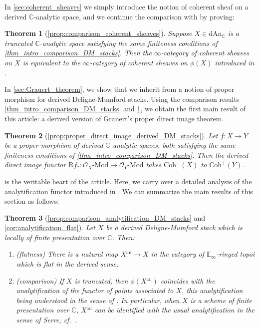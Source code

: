 \documentclass[12pt,a4paper,reqno]{amsart}
\theoremstyle{plain}
\newtheorem{thm-intro}{Theorem}
\theoremstyle{definition}
\theoremstyle{remark}
\numberwithin{equation}{section}
\begin{document}
In \cref{sec:coherent_sheaves} we simply introduce the notion of coherent sheaf on a derived {$\mathbb C$-analytic\xspace} space, and we continue the comparison with \cite{Porta_Yu_Higher_analytic_stacks_2014} by proving:

\begin{thm-intro}[{\cref{prop:comparison_coherent_sheaves}}] \label{thm_intro_comparison_coherent_sheaves}
	Suppose $X \in {\mathrm{dAn}_{\mathbb C}}$ is a truncated {$\mathbb C$-analytic\xspace} space satisfying the same finiteness conditions of \cref{thm_intro_comparison_DM_stacks}.
	Then the $\infty$-category of coherent sheaves on $X$ is equivalent to the $\infty$-category of coherent sheaves on $\phi(X)$ introduced in \cite{Porta_Yu_Higher_analytic_stacks_2014}.
\end{thm-intro}

In \cref{sec:Grauert_theorem}, we show that we inherit from \cite{Porta_Yu_Higher_analytic_stacks_2014} a notion of proper morphism for derived {Deligne-Mumford\xspace} stacks. Using the comparison results \cref{thm_intro_comparison_DM_stacks} and \cref{thm_intro_comparison_coherent_sheaves}, we obtain the first main result of this article: a derived version of Grauert's proper direct image theorem.

\begin{thm-intro}[{\cref{prop:proper_direct_image_derived_DM_stacks}}]
	Let $f \colon X \to Y$ be a proper morphism of derived {$\mathbb C$-analytic\xspace} spaces, both satisfying the same finiteness conditions of \cref{thm_intro_comparison_DM_stacks}. Then the derived direct image functor ${\mathrm R} f_* \colon {\mathcal O}_X \textrm{-} {\mathrm{Mod}} \to {\mathcal O}_Y \textrm{-} {\mathrm{Mod}}$ takes ${\mathrm{Coh}}^+(X)$ to ${\mathrm{Coh}}^+(Y)$.
\end{thm-intro}

 is the veritable heart of the article. Here, we carry over a detailed analysis of the analytification functor introduced in \cite[Remark 12.26]{DAG-IX}. We can summarize the main results of this section as follows:

\begin{thm-intro}[{\cref{prop:comparison_analytification_DM_stacks} and \cref{cor:analytification_flat}}]
	Let $X$ be a derived {Deligne-Mumford\xspace} stack which is locally of finite presentation over $\mathbb C$. Then:
	\begin{enumerate}
		\item (flatness) There is a natural map $X{^\mathrm{an}} \to X$ in the category of $\mathbb E_\infty$-ringed topoi which is flat in the derived sense.
		\item (comparison) If $X$ is truncated, then $\phi(X{^\mathrm{an}})$ coincides with the analytification of the functor of points associated to $X$, this analytification being understood in the sense of \cite{Porta_Yu_Higher_analytic_stacks_2014}. In particular, when $X$ is a scheme of finite presentation over $\mathbb C$, $X{^\mathrm{an}}$ can be identified with the usual analytification in the sense of Serre, cf.\ \cite[Expos\'e XII]{SGA1}.
	\end{enumerate}
\end{thm-intro}
\end{document}
